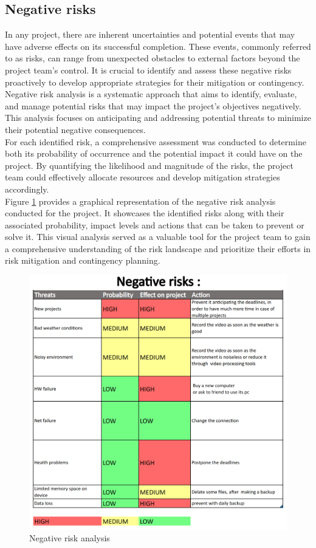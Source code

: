 \documentclass[eng]{class}
\begin{document}
\subsection{Negative risks}
In any project, there are inherent uncertainties and potential events that may have adverse effects on its successful completion.
These events, commonly referred to as risks, can range from unexpected obstacles to external factors beyond the project team's control.
It is crucial to identify and assess these negative risks proactively to develop appropriate strategies for their mitigation or contingency.
Negative risk analysis is a systematic approach that aims to identify, evaluate, and manage potential risks that may impact the project's objectives negatively.
This analysis focuses on anticipating and addressing potential threats to minimize their potential negative consequences.\\
For each identified risk, a comprehensive assessment was conducted to determine both its probability of occurrence and the potential impact it could have on the project.
By quantifying the likelihood and magnitude of the risks, the project team could effectively allocate resources and develop mitigation strategies accordingly.\\
Figure \ref{fig-4} provides a graphical representation of the negative risk analysis conducted for the project.
It showcases the identified risks along with their associated probability, impact levels and actions that can be taken to prevent or solve it. This visual analysis served as
a valuable tool for the project team to gain a comprehensive understanding of the risk landscape and prioritize their efforts
in risk mitigation and contingency planning.
\begin{figure}[h!]
  \centering
  \includegraphics[width=\columnwidth]{images/negative risks.png}
  \caption{Negative risk analysis}
  \label{fig-4}
\end{figure}
\end{document}
